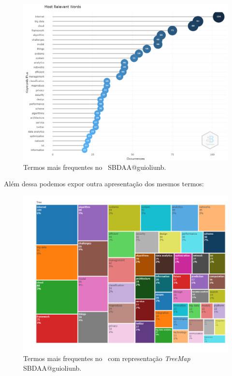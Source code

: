 \begin{figure}
    \centering
    \includegraphics[width=1\textwidth]{experiments/guioliunb/AnaliseBibliometrica/SocialBigDataAnalysis/MOST FREQUENT WORDS.png}
    \caption{Termos mais frequentes no \dataset\ SBDAA@guioliunb.}
    \label{fig:MASSA2-ReferenceSpectroscopy}
\end{figure}

Além dessa podemos expor outra apresentação dos mesmos termos:
\begin{figure}
    \centering
    \includegraphics[width=1\textwidth]{experiments/guioliunb/AnaliseBibliometrica/SocialBigDataAnalysis/TREEMAP.png}
    \caption{Termos mais frequentes no \dataset\ com representação \textit{TreeMap} SBDAA@guioliunb.}
    \label{fig:MASSA2-ReferenceSpectroscopy}
\end{figure}


